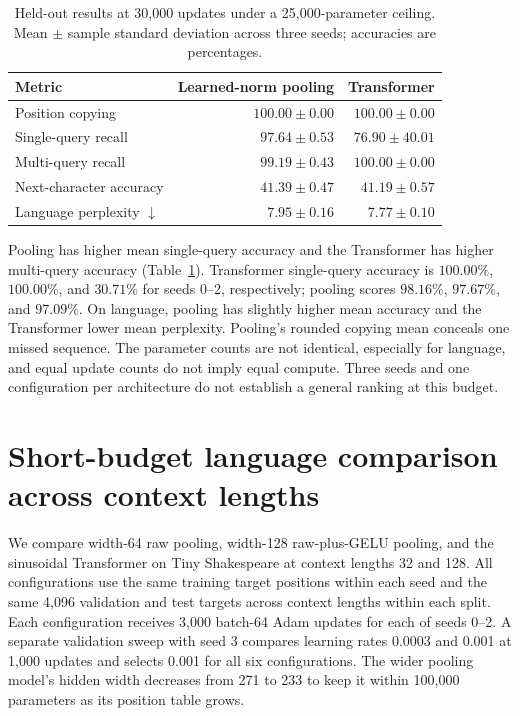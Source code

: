 \documentclass[11pt]{article}
\begin{document}
\begin{table}[ht]
\centering
\caption{Held-out results at 30,000 updates under a 25,000-parameter ceiling. Mean $\pm$ sample standard deviation across three seeds; accuracies are percentages.}
\label{tab:25k-comparison}
\begin{tabular}{lrr}
\toprule
Metric & Learned-norm pooling & Transformer\\
\midrule
Position copying & $100.00 \pm 0.00$ & $100.00 \pm 0.00$\\
Single-query recall & $97.64 \pm 0.53$ & $76.90 \pm 40.01$\\
Multi-query recall & $99.19 \pm 0.43$ & $100.00 \pm 0.00$\\
Next-character accuracy & $41.39 \pm 0.47$ & $41.19 \pm 0.57$\\
Language perplexity $\downarrow$ & $7.95 \pm 0.16$ & $7.77 \pm 0.10$\\
\bottomrule
\end{tabular}
\end{table}

Pooling has higher mean single-query accuracy and the Transformer has higher
multi-query accuracy (Table~\ref{tab:25k-comparison}). Transformer single-query
accuracy is $100.00\%$, $100.00\%$, and $30.71\%$ for seeds 0--2, respectively;
pooling scores $98.16\%$, $97.67\%$, and $97.09\%$. On language, pooling has
slightly higher mean accuracy and the Transformer lower mean perplexity.
Pooling's rounded copying mean conceals one missed sequence. The parameter
counts are not identical, especially for language, and equal update counts do
not imply equal compute. Three seeds and one configuration per architecture
do not establish a general ranking at this budget.

\section{Short-budget language comparison across context lengths}
We compare width-64 raw pooling, width-128 raw-plus-GELU pooling, and the sinusoidal Transformer on Tiny Shakespeare at context lengths 32 and 128. All configurations use the same training target positions within each seed and the same 4,096 validation and test targets across context lengths within each split. Each configuration receives 3,000 batch-64 Adam updates for each of seeds 0--2. A separate validation sweep with seed 3 compares learning rates 0.0003 and 0.001 at 1,000 updates and selects 0.001 for all six configurations. The wider pooling model's hidden width decreases from 271 to 233 to keep it within 100,000 parameters as its position table grows.
\end{document}
